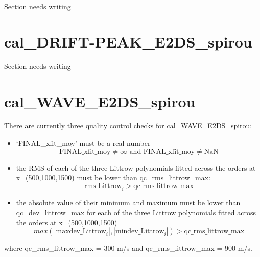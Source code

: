 
Section needs writing



\section{cal\_DRIFT-PEAK\_E2DS\_spirou}
\label{section:qc_cal_DRIFT-PEAK_E2DS}


Section needs writing


\section{cal\_WAVE\_E2DS\_spirou}
\label{section:qc_cal_WAVE_E2DS_spirou}

There are currently three quality control checks for cal\_WAVE\_E2DS\_spirou:

\begin{itemize}
\item `FINAL\_xfit\_moy' must be a real number
	\begin{equation}
	\text{FINAL\_xfit\_moy} \neq \infty \text{ and }
	\text{FINAL\_xfit\_moy} \neq \text{NaN}
	\end{equation}
\item the RMS of each of the three Littrow polynomials fitted across the orders at x=(500,1000,1500) must be lower than qc\_rms\_littrow\_max: 
	\begin{equation}
	\text{rms\_Littrow}_i > \text{qc\_rms\_littrow\_max}
	\end{equation}
\item the absolute value of their minimum and maximum must be lower than qc\_dev\_littrow\_max for each of the three Littrow polynomials fitted across the orders at x=(500,1000,1500)
	\begin{equation}
	max(|\text{maxdev\_Littrow}_i|, |\text{mindev\_Littrow}_i|) > \text{qc\_rms\_littrow\_max}
	\end{equation}
\end{itemize}

\noindent where qc\_rms\_littrow\_max = 300 m/s and qc\_rms\_littrow\_max = 900 m/s.



